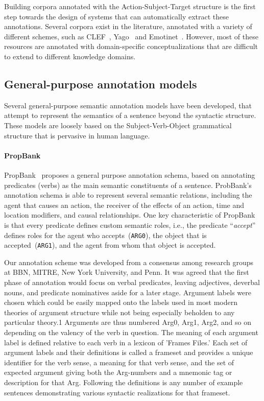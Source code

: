 Building corpora annotated with the Action-Subject-Target structure is the first step towards the design of systems that can automatically extract these annotations. Several corpora exist in the literature, annotated with a variety of different schemes, such as CLEF~\cite{kelly2016overview}, Yago~\cite{fabian2007yago} and Emotinet~\cite{emotinet}.
However, most of these resources are annotated with domain-specific conceptualizations that are difficult to extend to different knowledge domains.

  \subsection{General-purpose annotation models}\label{sec:general}

  Several general-purpose semantic annotation models have been developed, that attempt to represent the semantics of a sentence beyond the syntactic structure.
  These models are loosely based on the Subject-Verb-Object grammatical structure that is pervasive in human language.

  \paragraph{PropBank}

  PropBank~\cite{propbank} proposes a general purpose annotation schema, based on annotating predicates (verbs) as the main semantic constituents of a sentence. ProbBank's annotation schema is able to represent several semantic relations, including the agent that causes an action, the receiver of the effects of an action, time and location modifiers, and causal relationships.
  One key characteristic of PropBank is that every predicate defines custom semantic roles, i.e., the predicate ``\textit{accept}'' defines roles for the agent who accepts~(\texttt{ARG0}), the object that is accepted~(\texttt{ARG1}), and the agent from whom that object is accepted.

  Our annotation scheme was developed from a consensus among research
  groups at BBN, MITRE, New York University, and Penn. It was agreed that
  the first phase of annotation would focus on verbal predicates, leaving
  adjectives, deverbal nouns, and predicate nominatives aside for a later stage.
  Argument labels were chosen which could be easily mapped onto the labels
  used in most modern theories of argument structure while not being
  especially beholden to any particular theory.1
   Arguments are thus numbered
  Arg0, Arg1, Arg2, and so on depending on the valency of the verb in
  question. The meaning of each argument label is defined relative to each verb
  in a lexicon of ’Frames Files.’ Each set of argument labels and their
  definitions is called a frameset and provides a unique identifier for the verb
  sense, a meaning for that verb sense, and the set of expected argument giving
  both the Arg-numbers and a mnemonic tag or description for that Arg.
  Following the definitions is any number of example sentences demonstrating
  various syntactic realizations for that frameset.


